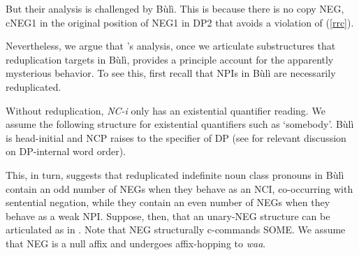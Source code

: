 \documentclass[output=paper,colorlinks,citecolor=brown]{langscibook}
\begin{document}
\z



But their analysis is challenged by Bùlì. This is because there is no copy NEG, cNEG1 in the original position of NEG1 in DP2 that avoids a violation of (\ref{rrc}).


\z

Nevertheless, we argue that \citeauthor{CollinsEtAl2017}'s analysis, once we articulate substructures that reduplication targets in Bùlì, provides a principle account for the apparently mysterious behavior. To see this, first recall that NPIs in Bùlì are necessarily reduplicated.

\z

\z

Without reduplication, \textit{NC-i} only has an existential quantifier reading. We assume the following structure for existential quantifiers such as `somebody'. Bùlì is head-initial and NCP raises to the specifier of DP (see \citealt{HiraiwaEtAl2017} for relevant discussion on DP-internal word order).

\z


This, in turn,  suggests that reduplicated indefinite noun class pronouns in Bùlì contain an odd number of NEGs when they behave as an NCI,  co-occurring with sentential negation, while they contain an even number of NEGs when they behave as a weak NPI. Suppose, then, that an unary-NEG structure can be articulated as in .  Note that NEG structurally c-commands SOME. We assume that NEG is a null affix and undergoes affix-hopping to \textit{waa}.
\end{document}
